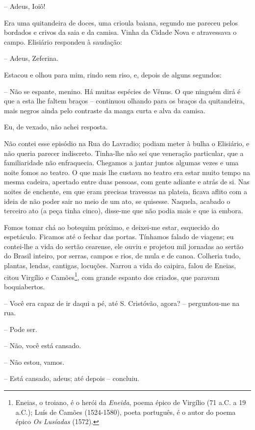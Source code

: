-- Adeus, Ioiô!

Era uma quitandeira de doces, uma crioula baiana, segundo me pareceu
pelos bordados e crivos da saia e da camisa. Vinha da Cidade Nova e
atravessava o campo. Elisiário respondeu à saudação:

-- Adeus, Zeferina.

Estacou e olhou para mim, rindo sem riso, e, depois de alguns segundos:

-- Não se espante, menino. Há muitas espécies de Vênus. O que ninguém
dirá é que a esta lhe faltem braços -- continuou olhando para os braços
da quitandeira, mais negros ainda pelo contraste da manga curta e alva
da camisa.

Eu, de vexado, não achei resposta.

Não contei esse episódio na Rua do Lavradio; podiam meter à bulha o
Elisiário, e não queria parecer indiscreto. Tinha-lhe não sei que
veneração particular, que a familiaridade não enfraquecia. Chegamos a
jantar juntos algumas vezes e uma noite fomos ao teatro. O que mais lhe
custava no teatro era estar muito tempo na mesma cadeira, apertado entre
duas pessoas, com gente adiante e atrás de si. Nas noites de enchente,
em que eram precisas travessas na plateia, ficava aflito com a ideia de
não poder sair no meio de um ato, se quisesse. Naquela, acabado o
terceiro ato (a peça tinha cinco), disse-me que não podia mais e que ia
embora.

Fomos tomar chá ao botequim próximo, e deixei-me estar, esquecido do
espetáculo. Ficamos até o fechar das portas. Tínhamos falado de viagens;
eu contei-lhe a vida do sertão cearense, ele ouviu e projetou mil
jornadas ao sertão do Brasil inteiro, por serras, campos e rios, de mula
e de canoa. Colheria tudo, plantas, lendas, cantigas, locuções. Narrou a
vida do caipira, falou de Eneias, citou Virgílio e Camões\footnote{Eneias,
  o troiano, é o herói da \emph{Eneida}, poema épico de Virgílio (71
  a.C. a 19 a.C.); Luís de Camões (1524-1580), poeta português, é o
  autor do poema épico \emph{Os Lusíadas} (1572).}, com grande espanto
dos criados, que paravam boquiabertos.

-- Você era capaz de ir daqui a pé, até S. Cristóvão, agora? --
perguntou-me na rua.

-- Pode ser.

-- Não, você está cansado.

-- Não estou, vamos.

-- Está cansado, adeus; até depois -- concluiu.

